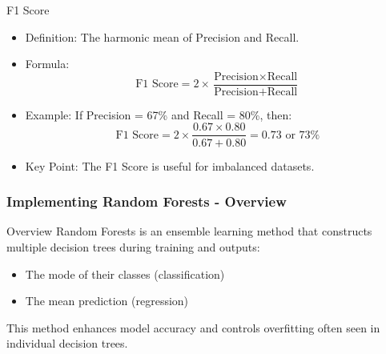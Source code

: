 \documentclass[aspectratio=169]{beamer}
\begin{document}
\begin{frame}[fragile]
    \begin{block}{F1 Score}
        \begin{itemize}
            \item Definition: The harmonic mean of Precision and Recall.
            \item Formula: 
            \begin{equation}
            \text{F1 Score} = 2 \times \frac{\text{Precision} \times \text{Recall}}{\text{Precision} + \text{Recall}}
            \end{equation}
            \item Example: If Precision = 67\% and Recall = 80\%, then:
            \begin{equation}
            \text{F1 Score} = 2 \times \frac{0.67 \times 0.80}{0.67 + 0.80} = 0.73 \text{ or } 73\%
            \end{equation}
            \item Key Point: The F1 Score is useful for imbalanced datasets.
        \end{itemize}
    \end{block}
\end{frame}

\begin{frame}[fragile]
    \frametitle{Implementing Random Forests - Overview}
    \begin{block}{Overview}
        Random Forests is an ensemble learning method that constructs multiple decision trees during training and outputs:
        \begin{itemize}
            \item The mode of their classes (classification) 
            \item The mean prediction (regression)
        \end{itemize}
        This method enhances model accuracy and controls overfitting often seen in individual decision trees.
    \end{block}
\end{frame}
\end{document}
